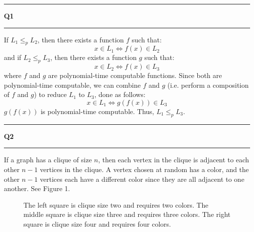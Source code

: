 \documentclass[11pt]{article}
\newcommand\question[2]{\vspace{.25in}\hrule\textbf{#1 #2}\vspace{.5em}\hrule\vspace{.10in}}
\begin{document}
\raggedright
\newcommand\NAME{Sean Connor (443-414-5111)}  %
\newcommand\HWNUM{3}              %
\question{Q1}{}
If $L_1 \leq_p L_2$, then there exists a function $f$ such that:
\begin{equation*}
x \in L_1 \iff f(x) \in L_2
\end{equation*} 
and if $L_2 \leq_p L_3$, then there exists a function $g$ such that:
\begin{equation*}
x \in L_2 \iff f(x) \in L_3
\end{equation*} 
where $f$ and $g$ are polynomial-time computable functions. Since both are polynomial-time computable, we can combine $f$ and $g$ (i.e. perform a composition of $f$ and $g$) to reduce $L_1$ to $L_3$, done as follows:
\begin{equation*}
x \in L_1 \iff g(f(x)) \in L_3
\end{equation*}
$g(f(x))$ is polynomial-time computable. Thus, $L_1 \leq_p L_3$.

\question{Q2}{}
If a graph has a clique of size $n$, then each vertex in the clique is adjacent to each other $n-1$ vertices in the clique. A vertex chosen at random has a color, and the other $n-1$ vertices each have a different color since they are all adjacent to one another. See Figure 1.

\begin{figure}[!htpb]
\centering
{}
\caption{The left square is clique size two and requires two colors. The middle square is clique size three and requires three colors. The right square is clique size four and requires four colors.}
\end{figure}
\end{document}
